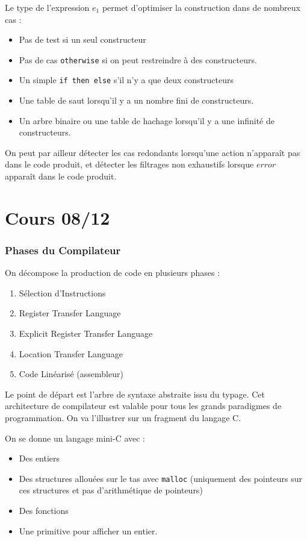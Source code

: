 \documentclass{cours}
\begin{document}
Le type de l'expression $e_{1}$ permet d'optimiser la construction dans de nombreux cas : 
\begin{itemize}
    \item Pas de test si un seul constructeur
    \item Pas de cas \texttt{otherwise} si on peut restreindre à des constructeurs. 
    \item Un simple \texttt{if then else} s'il n'y a que deux constructeurs
    \item Une table de saut lorsqu'il y a un nombre fini de constructeurs.
    \item Un arbre binaire ou une table de hachage lorsqu'il y a une infinité de constructeurs. 
\end{itemize}

On peut par ailleur détecter les cas redondants lorsqu'une action n'apparaît pas dans le code produit, et détecter les filtrages non exhaustifs lorsque $error$ apparaît dans le code produit. 

\part[Compilateur Optimisant]{Cours 08/12}
\section{Phases du Compilateur}
On décompose la production de code en plusieurs phases :
\begin{enumerate}
    \item Sélection d'Instructions
    \item Register Transfer Language
    \item Explicit Register Transfer Language
    \item Location Transfer Language
    \item Code Linéarisé (assembleur)
\end{enumerate}

Le point de départ est l'arbre de syntaxe abstraite issu du typage. Cet architecture de compilateur est valable pour tous les grands paradigmes de programmation. On va l'illustrer sur un fragment du langage C. 

On se donne un langage mini-C avec : 
\begin{itemize}
    \item Des entiers
    \item Des structures allouées sur le tas avec \texttt{malloc} (uniquement des pointeurs sur ces structures et pas d'arithmétique de pointeurs)
    \item Des fonctions
    \item Une primitive pour afficher un entier. 
\end{itemize}
\end{document}
